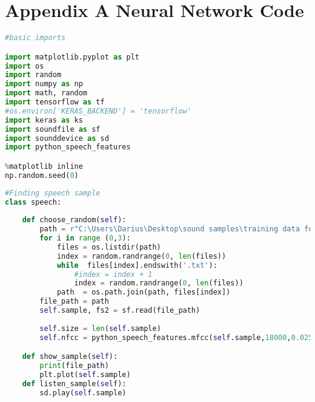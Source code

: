 \chapter{Appendix A Neural Network Code}\label{ch:appAlabel}

\begin{lstlisting}[language=Python, label=lst:imports]
#basic imports

import matplotlib.pyplot as plt
import os
import random
import numpy as np
import math, random
import tensorflow as tf
#os.environ['KERAS_BACKEND'] = 'tensorflow'
import keras as ks
import soundfile as sf
import sounddevice as sd
import python_speech_features

%matplotlib inline
np.random.seed(0)
\end{lstlisting}

\begin{lstlisting}[language=Python, label=lst:speechsample]
#Finding speech sample
class speech:
    
    def choose_random(self):
        path = r"C:\Users\Darius\Desktop\sound samples\training data for RNN\LibriSpeech\train-clean-100"
        for i in range (0,3):
            files = os.listdir(path)
            index = random.randrange(0, len(files))
            while  files[index].endswith('.txt'):
                #index = index + 1
                index = random.randrange(0, len(files))
            path  = os.path.join(path, files[index])
        file_path = path
        self.sample, fs2 = sf.read(file_path)
        
        self.size = len(self.sample)
        self.nfcc = python_speech_features.mfcc(self.sample,18000,0.025,0.01,24)

    def show_sample(self):
        print(file_path)
        plt.plot(self.sample)
    def listen_sample(self):
        sd.play(self.sample) 
\end{lstlisting}

